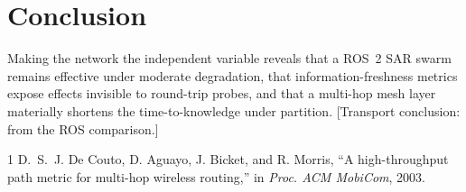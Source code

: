 \documentclass[conference]{IEEEtran}
\begin{document}
\section{Conclusion}
Making the network the independent variable reveals that a ROS~2 SAR swarm
remains effective under moderate degradation, that information-freshness metrics
expose effects invisible to round-trip probes, and that a multi-hop mesh layer
materially shortens the time-to-knowledge under partition. [Transport
conclusion: from the ROS comparison.]

\begin{thebibliography}{1}
D.~S.~J. De Couto, D. Aguayo, J. Bicket, and R. Morris,
``A high-throughput path metric for multi-hop wireless routing,''
in \emph{Proc. ACM MobiCom}, 2003.
\end{thebibliography}
\end{document}
